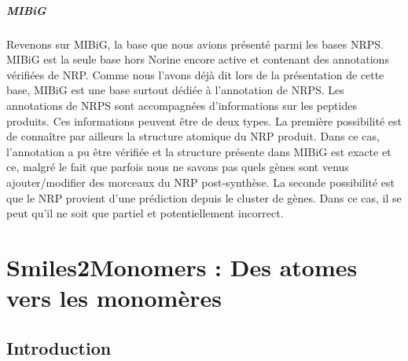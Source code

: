 \documentclass[12pt,french,twoside]{report}
\begin{document}
\paragraph{MIBiG}Revenons sur MIBiG, la base que nous avions présenté parmi les bases NRPS.
MIBiG est la seule base hors Norine encore active et contenant des annotations vérifiées de NRP.
Comme nous l'avons déjà dit lors de la présentation de cette base, MIBiG est une base surtout dédiée à l'annotation de NRPS.
Les annotations de NRPS sont accompagnées d'informations sur les peptides produits.
Ces informations peuvent être de deux types.
La première possibilité est de connaître par ailleurs la structure atomique du NRP produit.
Dans ce cas, l'annotation a pu être vérifiée et la structure présente dans MIBiG est exacte et ce, malgré le fait que parfois nous ne savons pas quels gènes sont venus ajouter/modifier des morceaux du NRP post-synthèse.
La seconde possibilité est que le NRP provient d'une prédiction depuis le cluster de gènes.
Dans ce cas, il se peut qu'il ne soit que partiel et potentiellement incorrect.















\chapter{Smiles2Monomers : Des atomes vers les monomères}

\section{Introduction}
\end{document}
